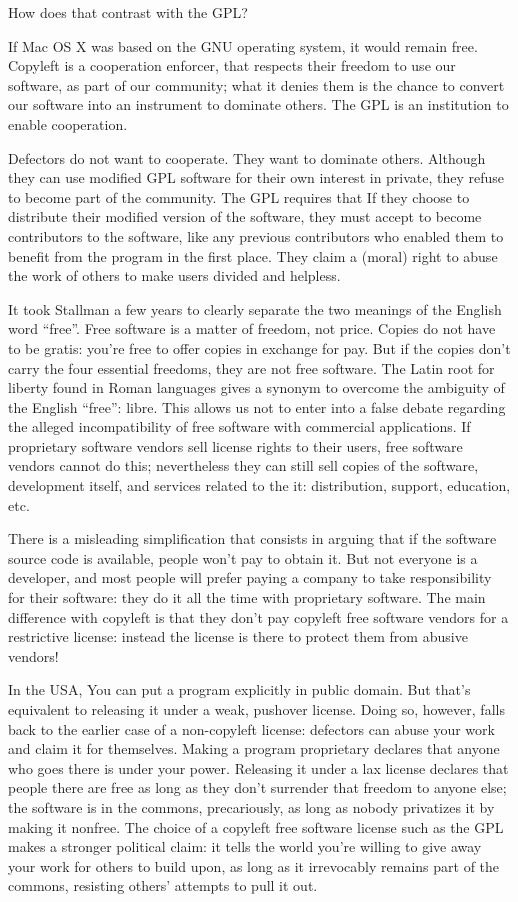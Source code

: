 How does that contrast with the GPL?

If Mac OS X was based on the GNU operating system, it would remain free.
Copyleft is a cooperation enforcer, that respects their freedom to use
our software, as part of our community; what it denies them is the
chance to convert our software into an instrument to dominate others.
The GPL is an institution to enable cooperation.

Defectors do not want to cooperate. They want to dominate others.
Although they can use modified GPL software for their own interest in
private, they refuse to become part of the community. The GPL requires
that If they choose to distribute their modified version of the
software, they must accept to become contributors to the software, like
any previous contributors who enabled them to benefit from the program
in the first place. They claim a (moral) right to abuse the work of
others to make users divided and helpless.

It took Stallman a few years to clearly separate the two meanings of the
English word ``free''. Free software is a matter of freedom, not price.
Copies do not have to be gratis: you're free to offer copies in exchange
for pay. But if the copies don't carry the four essential freedoms, they
are not free software. The Latin root for liberty found in Roman
languages gives a synonym to overcome the ambiguity of the English
``free'': libre. This allows us not to enter into a false debate
regarding the alleged incompatibility of free software with commercial
applications. If proprietary software vendors sell license rights to
their users, free software vendors cannot do this; nevertheless they can
still sell copies of the software, development itself, and services
related to the it: distribution, support, education, etc.

There is a misleading simplification that consists in arguing that if
the software source code is available, people won't pay to obtain it.
But not everyone is a developer, and most people will prefer paying a
company to take responsibility for their software: they do it all the
time with proprietary software. The main difference with copyleft is
that they don't pay copyleft free software vendors for a restrictive
license: instead the license is there to protect them from abusive
vendors!

In the USA, You can put a program explicitly in public domain. But
that's equivalent to releasing it under a weak, pushover license. Doing
so, however, falls back to the earlier case of a non-copyleft license:
defectors can abuse your work and claim it for themselves. Making a
program proprietary declares that anyone who goes there is under your
power. Releasing it under a lax license declares that people there are
free as long as they don't surrender that freedom to anyone else; the
software is in the commons, precariously, as long as nobody privatizes
it by making it nonfree. The choice of a copyleft free software license
such as the GPL makes a stronger political claim: it tells the world
you're willing to give away your work for others to build upon, as long
as it irrevocably remains part of the commons, resisting others'
attempts to pull it out.
